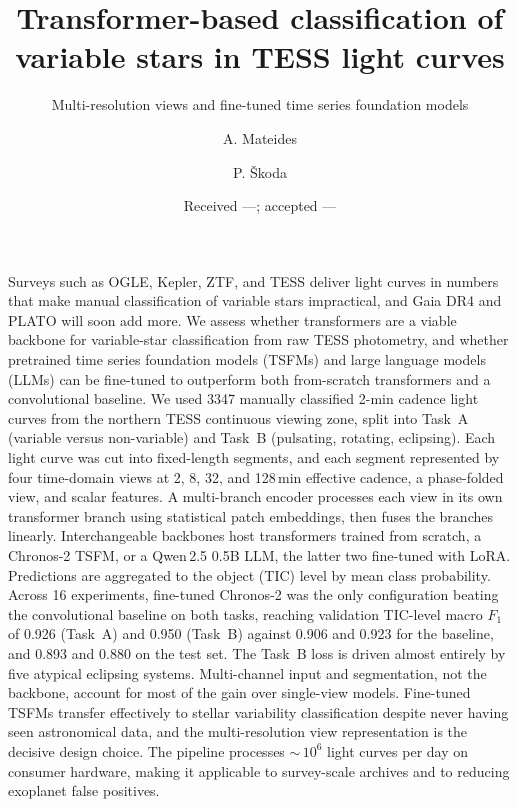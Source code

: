 \documentclass{aa}
\begin{document}
    \title{Transformer-based classification of variable stars in TESS light curves}

    \subtitle{Multi-resolution views and fine-tuned time series foundation models}

    \author{
        A. Mateides
        \and
        P. \v{S}koda
    }


    \date{Received ---; accepted ---}


    \abstract
    {Surveys such as OGLE, Kepler, ZTF, and TESS deliver light curves in numbers that make
    manual classification of variable stars impractical, and Gaia DR4 and PLATO will soon add more.}
    {We assess whether transformers are a viable backbone for variable-star classification
    from raw TESS photometry, and whether pretrained time series foundation models (TSFMs)
        and large language models (LLMs) can be fine-tuned to outperform both from-scratch
    transformers and a convolutional baseline.}
    {We used 3347 manually classified 2-min cadence light curves from the northern TESS
    continuous viewing zone, split into Task~A (variable versus
    non-variable) and Task~B (pulsating, rotating, eclipsing). Each light curve was cut
    into fixed-length segments, and each segment represented by four time-domain views at
    2, 8, 32, and 128\,min effective cadence, a phase-folded view, and scalar features. A
    multi-branch encoder processes each view in its own transformer branch using
    statistical patch embeddings, then fuses the branches linearly. Interchangeable
    backbones host transformers trained from scratch, a Chronos-2 TSFM, or a Qwen\,2.5
    0.5B LLM, the latter two fine-tuned with LoRA. Predictions are aggregated to the
    object (TIC) level by mean class probability.}
    {Across 16 experiments, fine-tuned Chronos-2 was the only configuration beating the
    convolutional baseline on both tasks, reaching validation TIC-level macro
        $F_1$ of 0.926 (Task~A) and 0.950 (Task~B) against 0.906 and 0.923 for the baseline,
        and 0.893 and 0.880 on the test set. The Task~B loss is driven almost entirely by five
        atypical eclipsing systems. Multi-channel input and segmentation, not the backbone,
        account for most of the gain over single-view models.}
    {Fine-tuned TSFMs transfer effectively to stellar variability classification despite
    never having seen astronomical data, and the multi-resolution view representation is
    the decisive design choice. The pipeline processes $\sim$\,$10^6$ light curves per day
    on consumer hardware, making it applicable to survey-scale archives and to reducing
    exoplanet false positives.}
\end{document}
